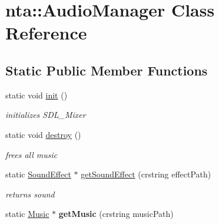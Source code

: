 \hypertarget{classnta_1_1AudioManager}{}\section{nta\+:\+:Audio\+Manager Class Reference}
\label{classnta_1_1AudioManager}
\subsection*{Static Public Member Functions}
\begin{DoxyCompactItemize}
\item 
\mbox{\label{classnta_1_1AudioManager_a4da570a6cee16bd6450031f7910057fd}} 
static void \hyperlink{classnta_1_1AudioManager_a4da570a6cee16bd6450031f7910057fd}{init} ()
\begin{DoxyCompactList}\small\item\em initializes S\+D\+L\+\_\+\+Mixer \end{DoxyCompactList}\item 
\mbox{\label{classnta_1_1AudioManager_aa337e5cc1825c6e2b971e1fc173b17ce}} 
static void \hyperlink{classnta_1_1AudioManager_aa337e5cc1825c6e2b971e1fc173b17ce}{destroy} ()
\begin{DoxyCompactList}\small\item\em frees all music \end{DoxyCompactList}\item 
\mbox{\label{classnta_1_1AudioManager_a131e8ec62c63fd9a07a77d833b02b598}} 
static \hyperlink{classnta_1_1SoundEffect}{Sound\+Effect} $\ast$ \hyperlink{classnta_1_1AudioManager_a131e8ec62c63fd9a07a77d833b02b598}{get\+Sound\+Effect} (crstring effect\+Path)
\begin{DoxyCompactList}\small\item\em returns sound \end{DoxyCompactList}\item 
\mbox{\label{classnta_1_1AudioManager_adb0a0f0efb072f57430835c849caaa39}} 
static \hyperlink{classnta_1_1Music}{Music} $\ast$ {\bfseries get\+Music} (crstring music\+Path)
\end{DoxyCompactItemize}
